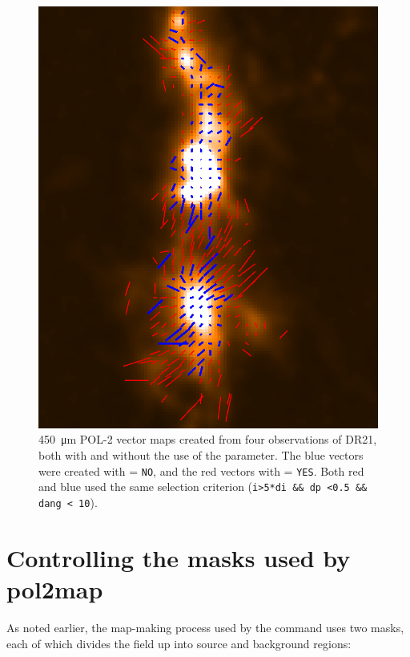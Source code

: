 \begin{figure}[ht!]
\begin{center}
\includegraphics[width=0.7\linewidth]{sc22-smooth450-450nosmo-1.png}
\caption [Example vector map showing the effect of the \poltwomap\  parameter.]{
  \SI{450}{\micro\metre} POL-2 vector maps created from four observations of DR21, both with and without the use of the  parameter. The blue vectors were created with  = \texttt{NO}, and the red vectors with  = \texttt{YES}. Both red and blue used the same selection criterion (\texttt{i>5*di \&\& dp <0.5 \&\& dang < 10}).
\label{fig:smooth450map}
}
\end{center}
\end{figure}


\section{Controlling the masks used by pol2map}

As noted earlier, the map-making process used by the \poltwomap command uses two masks, each of which divides the field up into source and background regions:

